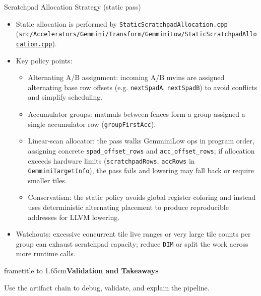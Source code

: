 \documentclass[aspectratio=169,10pt]{beamer}
\newcommand{\code}[1]{\texttt{\footnotesize #1}}
\newcommand{\repoRoot}{/home/lahcen/toolchains/onnx-mlir-xcompile/onnx-mlir}
\newcommand{\pathcode}[1]{\href{run:\repoRoot/#1}{\texttt{\scriptsize #1}}}
\newcommand{\sectiondivider}[2]{
  \begin{frame}[plain]
    \vspace*{1.75cm}
    \begin{beamercolorbox}[wd=\paperwidth,ht=1.65cm,dp=0cm,center]{frametitle}
      \vbox to 1.65cm{\vfil{\Large\bfseries #1}\vfil}
    \end{beamercolorbox}
    \vspace{0.65cm}
    \begin{center}
      {\large #2}
    \end{center}
  \end{frame}
}
\begin{document}
\begin{frame}{Scratchpad Allocation Strategy (static pass)}
  \scriptsize
  \begin{itemize}
    \item Static allocation is performed by \code{StaticScratchpadAllocation.cpp} (\pathcode{src/Accelerators/Gemmini/Transform/GemminiLow/StaticScratchpadAllocation.cpp}).
    \item Key policy points:
      \begin{itemize}
        \item Alternating A/B assignment: incoming A/B mvins are assigned alternating base row offsets (e.g. \code{nextSpadA}, \code{nextSpadB}) to avoid conflicts and simplify scheduling.
        \item Accumulator groups: matmuls between fences form a group assigned a single accumulator row (\code{groupFirstAcc}).
        \item Linear-scan allocator: the pass walks GemminiLow ops in program order, assigning concrete \code{spad_offset_rows} and \code{acc_offset_rows}; if allocation exceeds hardware limits (\code{scratchpadRows}, \code{accRows} in \code{GemminiTargetInfo}), the pass fails and lowering may fall back or require smaller tiles.
        \item Conservatism: the static policy avoids global register coloring and instead uses deterministic alternating placement to produce reproducible addresses for LLVM lowering.
      \end{itemize}
    \item Watchouts: excessive concurrent tile live ranges or very large tile counts per group can exhaust scratchpad capacity; reduce \code{DIM} or split the work across more runtime calls.
  \end{itemize}
\end{frame}

\sectiondivider{Validation and Takeaways}{Use the artifact chain to debug, validate, and explain the pipeline.}
\end{document}
